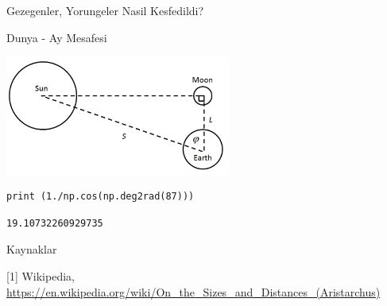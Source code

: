 \documentclass[12pt,fleqn]{article}\usepackage{../../common}
\begin{document}
Gezegenler, Yorungeler Nasil Kesfedildi?

Dunya - Ay Mesafesi

\includegraphics[width=20em]{sunmoon.png}

\begin{verbatim}
print (1./np.cos(np.deg2rad(87)))
\end{verbatim}

\begin{verbatim}
19.10732260929735
\end{verbatim}








Kaynaklar

[1] Wikipedia,
    \url{https://en.wikipedia.org/wiki/On_the_Sizes_and_Distances_(Aristarchus)}
\end{document}

